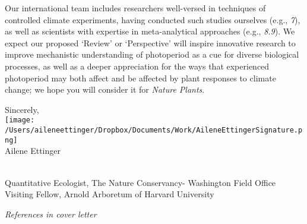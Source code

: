 \documentclass[10.5pt,a4paper]{letter}
\begin{document}
\begin{letter}{}
\par Our international team includes researchers well-versed in techniques of controlled climate experiments, having conducted such studies ourselves (e.g., \emph{7}), as well as scientists with expertise in meta-analytical approaches (e.g., \emph{8.9}). We expect our proposed `Review' or `Perspective' will inspire innovative research to
improve mechanistic understanding of photoperiod as a cue for diverse biological processes, as well as a deeper appreciation for the ways that experienced photoperiod may both affect and be affected by plant responses to climate change; we hope you will consider it for \emph{Nature Plants}.

\par Sincerely,\\

\texttt{[image: /Users/aileneettinger/Dropbox/Documents/Work/AileneEttingerSignature.png]} \\
Ailene Ettinger
\begin{footnotesize}\\
Quantitative Ecologist, The Nature Conservancy- Washington Field Office\\
Visiting Fellow, Arnold Arboretum of Harvard University 
\end{footnotesize}
 
 \noindent \emph{References in cover letter}


\end{letter}
\end{document}
